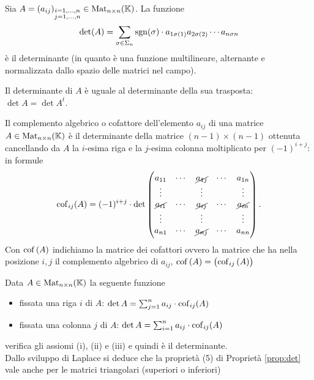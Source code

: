 \begin{thm}
	Sia $ A = (a_{ij})_{\substack{i = 1, \ldots, n \\ j = 1, \ldots, n}} \in \mathrm{Mat}_{n \times n} (\mathbb{K}) $. La funzione \[\det(A) = \sum_{\sigma \in \Sigma_n} \operatorname{sgn}(\sigma) \cdot a_{1 \sigma(1)} a_{2 \sigma(2)} \cdots a_{n \sigma{n}}\] è il determinante (in quanto è una funzione multilineare, alternante e normalizzata dallo spazio delle matrici nel campo). 
\end{thm}

\begin{corollary}
	Il determinante di $ A $ è uguale al determinante della sua trasposta: $ \det A = \det A^{t} $. 
\end{corollary}

\begin{definition}
	Il complemento algebrico o cofattore dell'elemento $ a_{ij} $ di una matrice $ A \in \mathrm{Mat}_{n \times n} (\mathbb{K}) $ è il determinante della matrice $ (n - 1) \times (n - 1) $ ottenuta cancellando da $ A $ la $ i $-esima riga e la $ j $-esima colonna moltiplicato per $ (-1)^{i + j} $: in formule
	\[\operatorname{cof}_{ij}(A) = (-1)^{i + j} \cdot \det 
	\begin{pmatrix}
	a_{11} & \cdots & \cancel{a_{1j}} & \cdots & a_{1n} \\
	\vdots &        & \vdots &        & \vdots \\
	\cancel{a_{i1}} & \cdots & \cancel{a_{ij}} & \cdots & \cancel{a_{in}} \\
	\vdots &  		& \vdots &  	  & \vdots \\
	a_{n1} & \cdots & \cancel{a_{nj}} & \cdots & a_{nn} \\
	\end{pmatrix}.\]
	Con $ \operatorname{cof}{(A)} $ indichiamo la matrice dei cofattori ovvero la matrice che ha nella posizione $ i, j $ il complemento algebrico di $ a_{ij} $, $ \operatorname{cof}{(A)} = \left(\operatorname{cof}_{ij}{(A)}\right) $
\end{definition}

\begin{thm}
	Data $ A \in \mathrm{Mat}_{n \times n} (\mathbb{K}) $ la seguente funzione
	\begin{itemize}
		\item fissata una riga $ i $ di $ A $: $ \det A = \sum_{j = 1}^{n} a_{ij} \cdot \operatorname{cof}_{ij} (A) $
		\item fissata una colonna $ j $ di $ A $: $ \det A = \sum_{i = 1}^{n} a_{ij} \cdot \operatorname{cof}_{ij} (A) $
	\end{itemize}
	verifica gli assiomi (i), (ii) e (iii) e quindi è il determinante. \\
	Dallo sviluppo di Laplace si deduce che la proprietà (5) di Proprietà \ref{prop:det} vale anche per le matrici triangolari (superiori o inferiori)
\end{thm}


